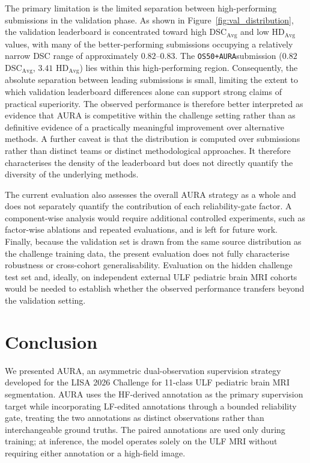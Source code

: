 \documentclass[runningheads]{llncs}
\newcommand{\method}{\texttt{OS50+AURA}}
\begin{document}
The primary limitation is the limited separation between high-performing submissions in the validation phase. As shown in Figure~\ref{fig:val_distribution}, the validation leaderboard is concentrated toward high DSC$_{\mathrm{Avg}}$ and low HD$_{\mathrm{Avg}}$ values, with many of the better-performing submissions occupying a relatively narrow DSC range of approximately $0.82$--$0.83$. The \method \space submission ($0.82$ DSC$_{\mathrm{Avg}}$, $3.41$ HD$_{\mathrm{Avg}}$) lies within this high-performing region. Consequently, the absolute separation between leading submissions is small, limiting the extent to which validation leaderboard differences alone can support strong claims of practical superiority. The observed performance is therefore better interpreted as evidence that AURA is competitive within the challenge setting rather than as definitive evidence of a practically meaningful improvement over alternative methods. A further caveat is that the distribution is computed over submissions rather than distinct teams or distinct methodological approaches. It therefore characterises the density of the leaderboard but does not directly quantify the diversity of the underlying methods.



The current evaluation also assesses the overall AURA strategy as a whole and does not separately quantify the contribution of each reliability-gate factor. A component-wise analysis would require additional controlled experiments, such as factor-wise ablations and repeated evaluations, and is left for future work. Finally, because the validation set is drawn from the same source distribution as the challenge training data, the present evaluation does not fully characterise robustness or cross-cohort generalisability. Evaluation on the hidden challenge test set and, ideally, on independent external ULF pediatric brain MRI cohorts would be needed to establish whether the observed performance transfers beyond the validation setting.


\section{Conclusion}

We presented AURA, an asymmetric dual-observation supervision strategy developed for the LISA 2026 Challenge for 11-class ULF pediatric brain MRI segmentation. AURA uses the HF-derived annotation as the primary supervision target while incorporating LF-edited annotations through a bounded reliability gate, treating the two annotations as distinct observations rather than interchangeable ground truths. The paired annotations are used only during training; at inference, the model operates solely on the ULF MRI without requiring either annotation or a high-field image.
\end{document}
